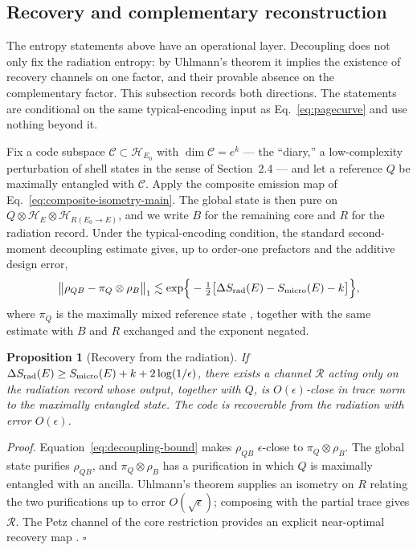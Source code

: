 \documentclass[12pt]{article}
\newcommand{\Smicro}{S_{\rm micro}}
\newtheorem{proposition}{Proposition}
\begin{document}
\subsection{Recovery and complementary reconstruction}
\label{sec:recovery}

The entropy statements above have an operational layer.  Decoupling does not
only fix the radiation entropy: by Uhlmann's theorem it implies the existence
of recovery channels on one factor, and their provable absence on the
complementary factor.  This subsection records both directions.  The
statements are conditional on the same typical-encoding input as
Eq.~\eqref{eq:pagecurve} and use nothing beyond it.

Fix a code subspace $\mathcal C\subset\mathcal H_{E_0}$ with
$\dim\mathcal C=e^k$ --- the ``diary,'' a low-complexity perturbation of
shell states in the sense of Section~2.4 --- and let a reference $Q$ be
maximally entangled with $\mathcal C$.  Apply the composite emission map of
Eq.~\eqref{eq:composite-isometry-main}.  The global state is then pure on
$Q\otimes\mathcal H_E\otimes\mathcal H_{R(E_0\to E)}$, and we write $B$ for
the remaining core and $R$ for the radiation record.  Under the
typical-encoding condition, the standard second-moment decoupling estimate
gives, up to order-one prefactors and the additive design error,
\begin{equation}
    \big\|\rho_{QB}-\pi_Q\otimes\rho_B\big\|_1
    \lesssim
    \exp\!\Big\{-\tfrac12\big[\Delta S_{\rm rad}(E)-\Smicro(E)-k\big]\Big\},
\label{eq:decoupling-bound}
\end{equation}
where $\pi_Q$ is the maximally mixed reference state
\cite{HaydenPreskill2007,HaydenHorodeckiWinterYard2008,
SzehrDupuisTomamichelRenner2013,Dupuis2014}, together with the same estimate
with $B$ and $R$ exchanged and the exponent negated.

\begin{proposition}[Recovery from the radiation]
\label{prop:recovery}
If $\Delta S_{\rm rad}(E)\ge\Smicro(E)+k+2\log(1/\epsilon)$, there exists a
channel $\mathcal R$ acting only on the radiation record whose output,
together with $Q$, is $O(\epsilon)$-close in trace norm to the maximally
entangled state.  The code is recoverable from the radiation with error
$O(\epsilon)$.
\end{proposition}

\emph{Proof.}  Equation~\eqref{eq:decoupling-bound} makes $\rho_{QB}$
$\epsilon$-close to $\pi_Q\otimes\rho_B$.  The global state purifies
$\rho_{QB}$, and $\pi_Q\otimes\rho_B$ has a purification in which $Q$ is
maximally entangled with an ancilla.  Uhlmann's theorem supplies an isometry
on $R$ relating the two purifications up to error $O(\sqrt\epsilon)$;
composing with the partial trace gives $\mathcal R$.  The Petz channel of the
core restriction provides an explicit near-optimal recovery map
\cite{Petz1986,BarnumKnill2002}.  \hfill$\square$
\end{document}

